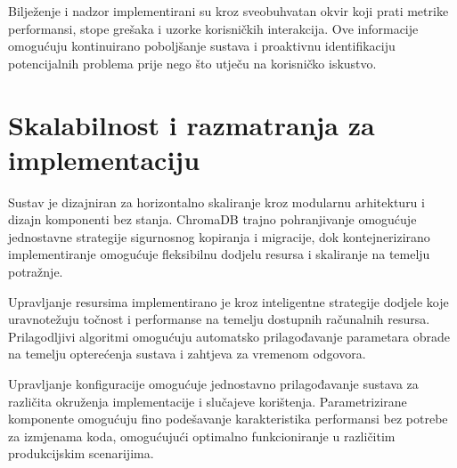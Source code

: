 Bilježenje i nadzor implementirani su kroz sveobuhvatan okvir koji prati metrike performansi, stope grešaka i uzorke korisničkih interakcija. Ove informacije omogućuju kontinuirano poboljšanje sustava i proaktivnu identifikaciju potencijalnih problema prije nego što utječu na korisničko iskustvo.

\section{Skalabilnost i razmatranja za implementaciju}
\label{sec:scalability}

Sustav je dizajniran za horizontalno skaliranje kroz modularnu arhitekturu i dizajn komponenti bez stanja. ChromaDB trajno pohranjivanje omogućuje jednostavne strategije sigurnosnog kopiranja i migracije, dok kontejnerizirano implementiranje omogućuje fleksibilnu dodjelu resursa i skaliranje na temelju potražnje.

Upravljanje resursima implementirano je kroz inteligentne strategije dodjele koje uravnotežuju točnost i performanse na temelju dostupnih računalnih resursa. Prilagodljivi algoritmi omogućuju automatsko prilagođavanje parametara obrade na temelju opterećenja sustava i zahtjeva za vremenom odgovora.

Upravljanje konfiguracije omogućuje jednostavno prilagođavanje sustava za različita okruženja implementacije i slučajeve korištenja. Parametrizirane komponente omogućuju fino podešavanje karakteristika performansi bez potrebe za izmjenama koda, omogućujući optimalno funkcioniranje u različitim produkcijskim scenarijima. 